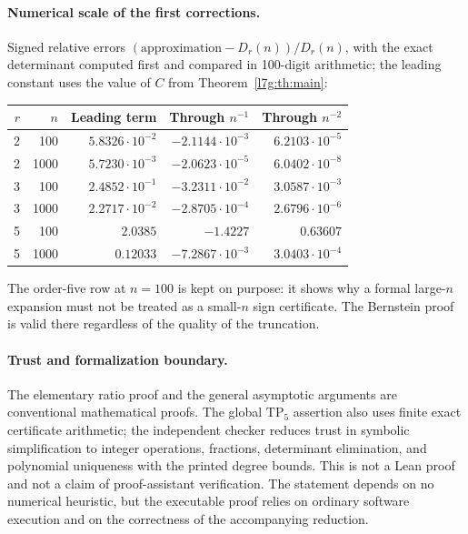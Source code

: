 \documentclass[11pt,letterpaper]{article}
\theoremstyle{remark}\newtheorem{remark}[theorem]{Remark}
\newcommand{\TP}{\mathrm{TP}}\newcommand{\TN}{\mathrm{TN}}
\newcounter{l7gtrsavedeq}
\begin{document}
\paragraph{Numerical scale of the first corrections.}
Signed relative errors $(\text{approximation}-D_r(n))/D_r(n)$, with the
exact determinant computed first and compared in 100-digit arithmetic; the
leading constant uses the value of $C$ from Theorem~\ref{l7g:th:main}:
\begin{center}\small
\begin{tabular}{rrrrr}
\toprule
$r$ & $n$ & Leading term & Through $n^{-1}$ & Through $n^{-2}$\\
\midrule
2 & 100 & $5.8326\cdot10^{-2}$ & $-2.1144\cdot10^{-3}$ & $6.2103\cdot10^{-5}$\\
2 & 1000 & $5.7230\cdot10^{-3}$ & $-2.0623\cdot10^{-5}$ & $6.0402\cdot10^{-8}$\\
3 & 100 & $2.4852\cdot10^{-1}$ & $-3.2311\cdot10^{-2}$ & $3.0587\cdot10^{-3}$\\
3 & 1000 & $2.2717\cdot10^{-2}$ & $-2.8705\cdot10^{-4}$ & $2.6796\cdot10^{-6}$\\
5 & 100 & $2.0385$ & $-1.4227$ & $0.63607$\\
5 & 1000 & $0.12033$ & $-7.2867\cdot10^{-3}$ & $3.0403\cdot10^{-4}$\\
\bottomrule
\end{tabular}
\end{center}
The order-five row at $n=100$ is kept on purpose: it shows why a formal
large-$n$ expansion must not be treated as a small-$n$ sign certificate. The
Bernstein proof is valid there regardless of the quality of the truncation.

\paragraph{Trust and formalization boundary.}
The elementary ratio proof and the general asymptotic arguments are
conventional mathematical proofs. The global $\TP_5$ assertion also uses
finite exact certificate arithmetic; the independent checker reduces trust
in symbolic simplification to integer operations, fractions, determinant
elimination, and polynomial uniqueness with the printed degree bounds. This
is not a Lean proof and not a claim of proof-assistant verification. The
statement depends on no numerical heuristic, but the executable proof
relies on ordinary software execution and on the correctness of the
accompanying reduction.
\end{document}
